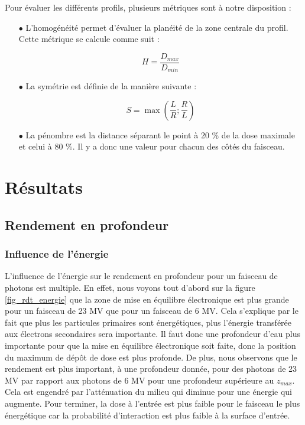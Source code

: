 \documentclass{article}
\begin{document}
Pour évaluer les différents profils, plusieurs métriques sont à notre disposition :

\begin{itemize}
  \item[$\bullet$] L'homogénéité permet d'évaluer la planéité de la zone centrale du profil. Cette métrique se calcule comme suit :
  
  \begin{equation}
    H = \dfrac{D_{max}}{D_{min}}
    \label{eq_homogeneite}
  \end{equation}

  \item[$\bullet$] La symétrie est définie de la manière suivante :

  \begin{equation}
    S = \max\left(\dfrac{L}{R}; \dfrac{R}{L}\right)
    \label{eq_symetrie}
  \end{equation}

  \item[$\bullet$] La pénombre est la distance séparant le point à 20 \% de la dose maximale et celui à 80 \%. Il y a donc une valeur pour chacun des côtés du faisceau.

\end{itemize}

\section{Résultats}
\subsection{Rendement en profondeur}
\subsubsection{Influence de l'énergie}

L'influence de l'énergie sur le rendement en profondeur pour un faisceau de photons est multiple. En effet, nous voyons tout d'abord sur la figure \ref*{fig_rdt_energie} que la zone de mise en équilibre électronique est plus grande pour un faisceau de 23 MV que pour un faisceau de 6 MV. Cela s'explique par le fait que plus les particules primaires sont énergétiques, plus l'énergie transférée aux électrons secondaires sera importante. Il faut donc une profondeur d'eau plus importante pour que la mise en équilibre électronique soit faite, donc la position du maximum de dépôt de dose est plus profonde. De plus, nous observons que le rendement est plus important, à une profondeur donnée, pour des photons de 23 MV par rapport aux photons de 6 MV pour une profondeur supérieure au $z_{max}$. Cela est engendré par l'atténuation du milieu qui diminue pour une énergie qui augmente. Pour terminer, la dose à l'entrée est plus faible pour le faisceau le plus énergétique car la probabilité d'interaction est plus faible à la surface d'entrée.
\end{document}
